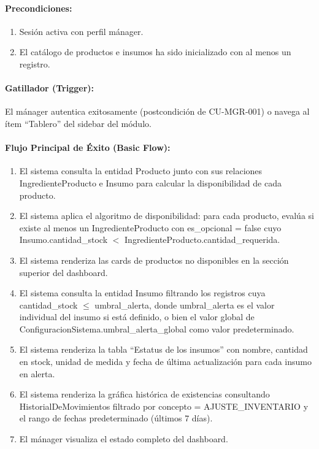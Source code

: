 \paragraph{Precondiciones:}
\begin{enumerate}
    \item[I.] Sesión activa con perfil mánager.
    \item[II.] El catálogo de productos e insumos ha sido inicializado con al menos un registro.
\end{enumerate}

\paragraph{Gatillador (Trigger):} El mánager autentica exitosamente (postcondición de CU-MGR-001) o navega al ítem ``Tablero'' del sidebar del módulo.

\paragraph{Flujo Principal de Éxito (Basic Flow):}
\begin{enumerate}
    \item[I.] El sistema consulta la entidad Producto junto con sus relaciones IngredienteProducto e Insumo para calcular la disponibilidad de cada producto.
    \item[II.] El sistema aplica el algoritmo de disponibilidad: para cada producto, evalúa si existe al menos un IngredienteProducto con es\_opcional = false cuyo Insumo.cantidad\_stock $<$ IngredienteProducto.cantidad\_requerida.
    \item[III.] El sistema renderiza las cards de productos no disponibles en la sección superior del dashboard.
    \item[IV.] El sistema consulta la entidad Insumo filtrando los registros cuya cantidad\_stock $\le$ umbral\_alerta, donde umbral\_alerta es el valor individual del insumo si está definido, o bien el valor global de ConfiguracionSistema.umbral\_alerta\_global como valor predeterminado.
    \item[V.] El sistema renderiza la tabla ``Estatus de los insumos'' con nombre, cantidad en stock, unidad de medida y fecha de última actualización para cada insumo en alerta.
    \item[VI.] El sistema renderiza la gráfica histórica de existencias consultando HistorialDeMovimientos filtrado por concepto = AJUSTE\_INVENTARIO y el rango de fechas predeterminado (últimos 7 días).
    \item[VII.] El mánager visualiza el estado completo del dashboard.
\end{enumerate}

